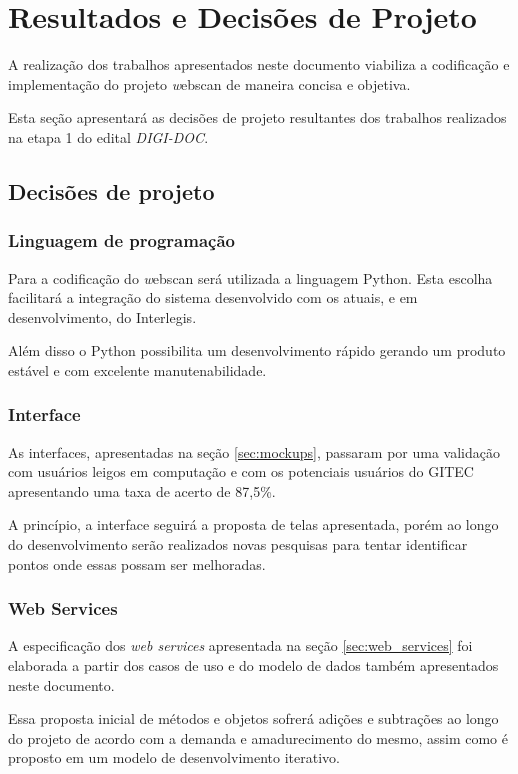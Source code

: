 \section{Resultados e Decisões de Projeto}
\label{sec:resultados}

A realização dos trabalhos apresentados neste documento viabiliza a
codificação e implementação do projeto {\emph webscan} de maneira
concisa e objetiva.

Esta seção apresentará as decisões de projeto resultantes dos trabalhos
realizados na etapa 1 do edital \emph{DIGI-DOC}.

\subsection{Decisões de projeto}

\subsubsection{Linguagem de programação}
Para a codificação do {\emph webscan} será utilizada a linguagem Python.
Esta escolha facilitará a integração do sistema desenvolvido com os atuais,
e em desenvolvimento, do Interlegis.

Além disso o Python possibilita um desenvolvimento rápido gerando
um produto estável e com excelente manutenabilidade. 

\subsubsection{Interface}
As interfaces, apresentadas na seção \ref{sec:mockups}, passaram por uma
validação com usuários leigos em computação e com os potenciais usuários
do GITEC apresentando uma taxa de acerto de 87,5\%.

A princípio, a interface seguirá a proposta de telas apresentada,
porém ao longo do desenvolvimento serão realizados novas pesquisas para
tentar identificar pontos onde essas possam ser melhoradas. 

\subsubsection{Web Services}
A especificação dos \emph{web services} apresentada na 
seção \ref{sec:web_services} foi elaborada a partir dos casos de uso
e do modelo de dados também apresentados neste documento.

Essa proposta inicial de métodos e objetos sofrerá adições e subtrações 
ao longo do projeto de acordo com a demanda e amadurecimento do mesmo,
assim como é proposto em um modelo de desenvolvimento iterativo.


